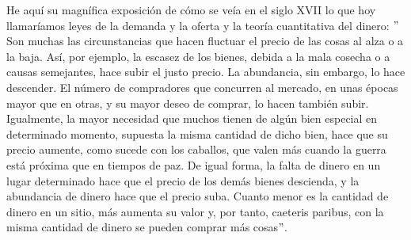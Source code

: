 \documentclass[10pt]{book}
\begin{document}
He aquí su magnífica exposición de cómo se veía en el siglo XVII lo que hoy llamaríamos leyes de la demanda y la oferta y la teoría cuantitativa del dinero: $"$ Son muchas las circunstancias que hacen fluctuar el precio de las cosas al alza o a la baja. Así, por ejemplo, la escasez de los bienes, debida a la mala cosecha o a causas semejantes, hace subir el justo precio. La abundancia, sin embargo, lo hace descender. El número de compradores que concurren al mercado, en unas épocas mayor que en otras, y su mayor deseo de comprar, lo hacen también subir. Igualmente, la mayor necesidad que muchos tienen de algún bien especial en determinado momento, supuesta la misma cantidad de dicho bien, hace que su precio aumente, como sucede con los caballos, que valen más cuando la guerra está próxima que en tiempos de paz. De igual forma, la falta de dinero en un lugar determinado hace que el precio de los demás bienes descienda, y la abundancia de dinero hace que el precio suba. Cuanto menor es la cantidad de dinero en un sitio, más aumenta su valor y, por tanto, caeteris paribus, con la misma cantidad de dinero se pueden comprar más cosas$"$.
\end{document}
